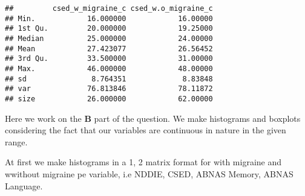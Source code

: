 \documentclass[]{article}
\newenvironment{Shaded}{\begin{snugshade}}{\end{snugshade}}
\newcommand{\KeywordTok}[1]{\textcolor[rgb]{0.13,0.29,0.53}{\textbf{#1}}}
\newcommand{\DecValTok}[1]{\textcolor[rgb]{0.00,0.00,0.81}{#1}}
\newcommand{\StringTok}[1]{\textcolor[rgb]{0.31,0.60,0.02}{#1}}
\newcommand{\OperatorTok}[1]{\textcolor[rgb]{0.81,0.36,0.00}{\textbf{#1}}}
\newcommand{\NormalTok}[1]{#1}
\begin{document}
\begin{Shaded}
\end{Shaded}

\begin{verbatim}
##         csed_w_migraine_c csed_w.o_migraine_c
## Min.            16.000000            16.00000
## 1st Qu.         20.000000            19.25000
## Median          25.000000            24.00000
## Mean            27.423077            26.56452
## 3rd Qu.         33.500000            31.00000
## Max.            46.000000            48.00000
## sd               8.764351             8.83848
## var             76.813846            78.11872
## size            26.000000            62.00000
\end{verbatim}

Here we work on the \textbf{B} part of the question. We make histograms
and boxplots considering the fact that our variables are continuous in
nature in the given range.

At first we make histograms in a 1, 2 matrix format for with migraine
and wwithout migraine pe variable, i.e NDDIE, CSED, ABNAS Memory, ABNAS
Language.
\end{document}
